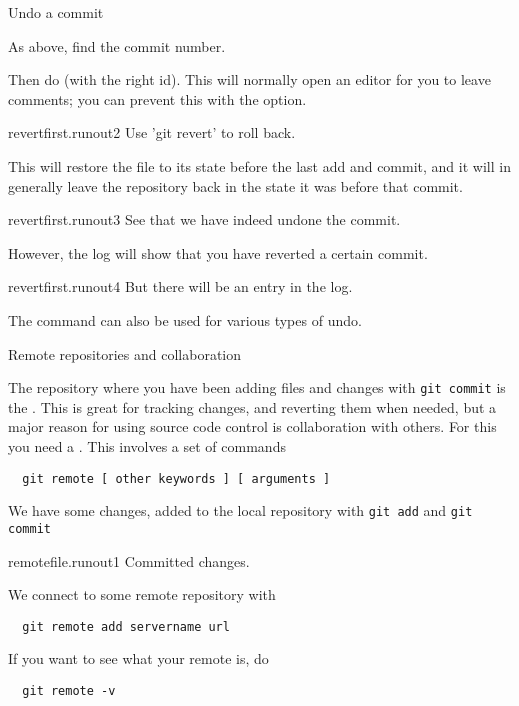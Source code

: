  {Undo a commit}

As above, find the commit number.

Then do  (with the right id).
This will normally open an editor for you to leave comments;
you can prevent this with the  option.

\begin{gitstep}{revertfirst.runout2}
  Use 'git revert' to roll back.
\end{gitstep}

This will restore the file to its state before the last
add and commit, and it will in generally leave the repository back
in the state it was before that commit.

\begin{gitstep}{revertfirst.runout3}
  See that we have indeed undone the commit.
\end{gitstep}

However, the log will show that you have reverted a certain commit.

\begin{gitstep}{revertfirst.runout4}
  But there will be an entry in the log.
\end{gitstep}

The  command can also be used for various
types of undo.

 {Remote repositories and collaboration}
\label{sec:git-remote}

The repository where you have been adding files and changes with
\lstinline{git commit} is the .
This is great for tracking changes, and reverting them when needed,
but a major reason for using source code control is collaboration
with others.
For this you need a .
This involves a set of commands
\begin{lstlisting}
  git remote [ other keywords ] [ arguments ]
\end{lstlisting}

We have some changes, added to the local repository
with \lstinline{git add} and \lstinline{git commit}

\begin{gitstep}{remotefile.runout1}
  Committed changes.
\end{gitstep}

We connect to some remote repository with
\begin{lstlisting}
  git remote add servername url
\end{lstlisting}
If you want to see what your remote is, do
\begin{lstlisting}
  git remote -v
\end{lstlisting}

